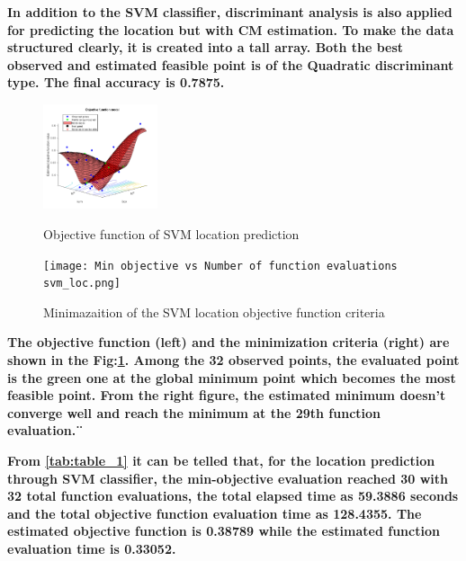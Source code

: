 \documentclass[5p]{elsarticle}
\begin{document}
\begin{frontmatter}
\bf In addition to the SVM classifier, discriminant analysis is also applied for predicting the location but with CM estimation. To make the data structured clearly, it is created into a tall array. Both the best observed and estimated feasible point is of the Quadratic discriminant type. The final accuracy is 0.7875.


\begin{figure}[h!]
  \begin{minipage}
  \begin{center}
    \includegraphics[width=0.3\textwidth]{svm_loc Objective function model bd.png}
  \end{center}
  \caption{Objective function of SVM location prediction}
  \end{minipage}
  \begin{minipage}
  \begin{center}
    \texttt{[image: Min objective vs Number of function evaluations svm\_loc.png]}
  \end{center}
  \caption{Minimazaition of the SVM location objective function criteria}
  \end{minipage}
  \label{fig_19}  
\end{figure}

\bf  The objective function (left) and the minimization criteria (right) are shown in the Fig:\ref{fig_19}. Among the 32 observed points, the evaluated point is the green one at the global minimum point which becomes the most feasible point. From the right figure, the estimated minimum doesn't converge well and reach the minimum at the 29th function evaluation.¨

\bf  From \ref{tab:table_1} it can be telled that, for the location prediction through SVM classifier, the min-objective evaluation reached 30 with 32 total function evaluations, the total elapsed time as 59.3886 seconds and the total objective function evaluation time as 128.4355. The estimated objective function is 0.38789 while the estimated function evaluation time is 0.33052.


\end{frontmatter}
\end{document}
